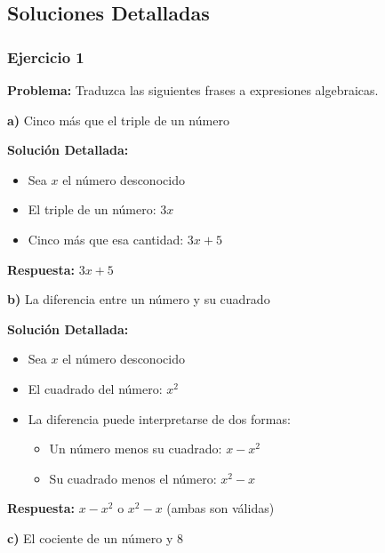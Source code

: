 
\subsection*{Soluciones Detalladas}


\subsubsection*{Ejercicio 1}
\textbf{Problema:} Traduzca las siguientes frases a expresiones algebraicas.

\medskip

\textbf{a)} Cinco más que el triple de un número

\textbf{Solución Detallada:}
\begin{itemize}
    \item Sea $x$ el número desconocido
    \item El triple de un número: $3x$
    \item Cinco más que esa cantidad: $3x + 5$
\end{itemize}

\textbf{Respuesta:} $3x + 5$

\medskip

\textbf{b)} La diferencia entre un número y su cuadrado

\textbf{Solución Detallada:}
\begin{itemize}
    \item Sea $x$ el número desconocido
    \item El cuadrado del número: $x^2$
    \item La diferencia puede interpretarse de dos formas:
    \begin{itemize}
        \item Un número menos su cuadrado: $x - x^2$
        \item Su cuadrado menos el número: $x^2 - x$
    \end{itemize}
\end{itemize}

\textbf{Respuesta:} $x - x^2$ o $x^2 - x$ (ambas son válidas)

\medskip

\textbf{c)} El cociente de un número y 8

